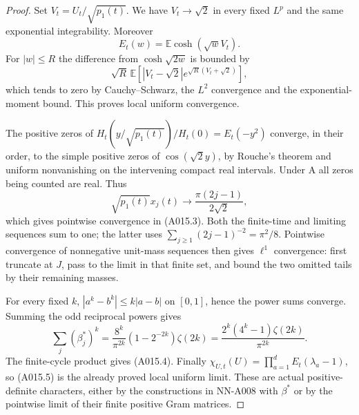 \begin{proof}
Set $V_t=U_t/\sqrt{p_1(t)}$. We have $V_t\to\sqrt2$ in every
fixed $L^p$ and the same exponential integrability. Moreover
\[
 E_t(w)=\mathbb E\cosh(\sqrt w V_t).
\]
For $|w|\le R$ the difference from $\cosh\sqrt{2w}$ is bounded by
\[
 \sqrt R\,\mathbb E\left[
 |V_t-\sqrt2|e^{\sqrt R(V_t+\sqrt2)}\right],
\]
which tends to zero by Cauchy--Schwarz, the $L^2$ convergence and the
exponential-moment bound. This proves local uniform convergence.

The positive zeros of
$H_t(y/\sqrt{p_1(t)})/H_t(0)=E_t(-y^2)$ converge, in their order,
to the simple positive zeros of $\cos(\sqrt2y)$, by Rouche's theorem
and uniform nonvanishing on the intervening compact real intervals.
Under A all zeros being counted are real. Thus
\[
 \sqrt{p_1(t)}x_j(t)\to\frac{\pi(2j-1)}{2\sqrt2},
\]
which gives pointwise convergence in (A015.3). Both the finite-time
and limiting sequences sum to one; the latter uses
$\sum_{j\ge1}(2j-1)^{-2}=\pi^2/8$. Pointwise convergence of
nonnegative unit-mass sequences then gives $\ell^1$ convergence:
first truncate at $J$, pass to the limit in that finite set, and
bound the two omitted tails by their remaining masses.

For every fixed $k$, $|a^k-b^k|\le k|a-b|$ on $[0,1]$, hence
the power sums converge. Summing the odd reciprocal powers gives
\[
 \sum_j(\beta_j^*)^k
 =\frac{8^k}{\pi^{2k}}(1-2^{-2k})\zeta(2k)
 =\frac{2^k(4^k-1)\zeta(2k)}{\pi^{2k}}.
\]
The finite-cycle product gives (A015.4). Finally
$\chi_{U,t}(U)=\prod_{a=1}^d E_t(\lambda_a-1)$, so (A015.5)
is the already proved local uniform limit. These are actual
positive-definite characters, either by the constructions in NN-A008
with $\beta^*$ or by the pointwise limit of their finite positive
Gram matrices.
\end{proof}

